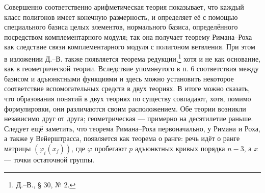 \documentclass[11pt]{article}
\begin{document}
Совершенно соответственно арифметическая теория показывает, что каждый класс полигонов имеет конечную размерность, и определяет её с помощью специального базиса целых элементов, нормального базиса, определённого посредством комплементарного модуля; так она получает теорему Римана--Роха как следствие связи комплементарного модуля с полигоном ветвления. При этом в изложении Д.--В. также появляется теорема редукции,\footnote{Д.--В., § 30, № 2.} хотя и не как основание, как в геометрической теории. Вследствие упомянутого в п. 6 соответствия между базисом и адъюнктными функциями и здесь можно установить некоторое соответствие вспомогательных средств в двух теориях. В итоге можно сказать, что образования понятий в двух теориях по существу совпадают, хотя, помимо формулировки, они различаются своим расположением. Обе теории возникли независимо друг от друга; геометрическая --- примерно на десятилетие раньше. Следует ещё заметить, что теорема Римана--Роха первоначально, у Римана и Роха, а также у Вейерштрасса, появляется как теорема о ранге: речь идёт о ранге матрицы \((\varphi_i(x_j))\), где \(\varphi\) пробегают \(p\) адъюнктных кривых порядка \(n-3\), а \(x\) --- точки остаточной группы.
\end{document}
